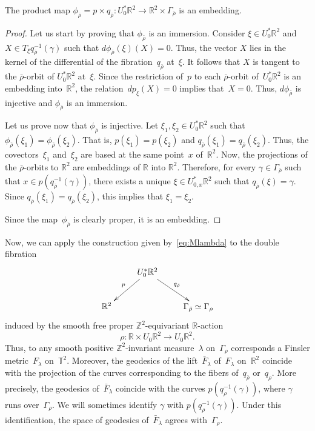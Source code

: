 \documentclass[AHL,Unicode,longabstracts,published]{cedram}
\newcommand{\Z}{\mathbb{Z}}
\newcommand{\R}{\mathbb{R}}
\newcommand{\T}{\mathbb{T}}
\begin{document}
\begin{lemm}
The product map $\phi_{\bar{\rho}}=p \times q_{\bar{\rho}}:U^{*}_{0}\R^{2}\rightarrow\R^{2}\times\Gamma_{\bar{\rho}}$ is an embedding.
\end{lemm}

\begin{proof}
Let us start by proving that $\phi_{\bar{\rho}}$ is an immersion. Consider $\xi\in U_0^{*}\R^{2}$ and $X\in T_{\xi} q_{\bar{\rho}}^{-1}(\gamma)$ such that $d\phi_{\bar{\rho}}(\xi)(X)=0$. Thus, the vector $X$ lies in the kernel of the differential of the fibration~$q_{\bar{\rho}}$ at~$\xi$. It follows that $X$ is tangent to the $\bar{\rho}$-orbit of $U_0^{*}\R^{2}$ at~$\xi$. Since the restriction of~$p$ to each $\bar{\rho}$-orbit of~$U_0^*\R^2$ is an embedding into~$\R^2$, the relation~$dp_\xi(X)=0$ implies that~$X=0$. Thus, $d\phi_{\bar{\rho}}$ is injective and $\phi_{\bar{\rho}}$ is an immersion.

Let us prove now that $\phi_{\bar{\rho}}$ is injective. Let $\xi_{1}, \xi_{2} \in U_0^{*}\R^{2}$ such that $\phi_{\bar{\rho}}(\xi_{1})=\phi_{\bar{\rho}}(\xi_{2})$. That is, $p(\xi_{1})=p(\xi_{2})$ and $q_{\bar{\rho}}(\xi_{1})=q_{\bar{\rho}}(\xi_{2})$. Thus, the covectors~$\xi_{1}$ and~$\xi_{2}$ are based at the same point~$x$ of~$\R^{2}$. Now, the projections of the $\bar{\rho}$-orbits to $\R^{2}$ are embeddings of $\R$ into $\R^{2}$. Therefore, for every $\gamma\in\Gamma_{\bar{\rho}}$ such that $x\in p(q_{\bar{\rho}}^{-1}(\gamma))$, there exists a unique $\xi\in U^{*}_{0,x}\R^{2}$ such that $q_{\bar{\rho}}(\xi)=\gamma$. Since $q_{\bar{\rho}}(\xi_1) = q_{\bar{\rho}}(\xi_2)$, this implies that $\xi_{1}=\xi_{2}$.

Since the map~$\phi_{\bar{\rho}}$ is clearly proper, it is an embedding.
\end{proof}


Now, we can apply the construction given by~\eqref{eq:Mlambda} to the double fibration
\[
\xymatrix{ & U_0^* \R^2 \ar[dl]_p \ar[dr]^{q_{\bar{\rho}}} \\
\R^2 & & \Gamma_{\bar{\rho}} \simeq \Gamma_\rho}
\]
induced by the smooth free proper $\Z^2$-equivariant $\R$-action
\[
\rho:\R \times U_0\R^2 \to U_0\R^2.
\]
Thus, to any smooth positive $\Z^2$-invariant measure~$\lambda$ on~$\Gamma_\rho$ corresponds a Finsler metric~$F_\lambda$ on~$\T^2$. Moreover, the geodesics of the lift~$\bar{F}_\lambda$ of~$F_\lambda$ on~$\R^2$ coincide with the projection of the curves corresponding to the fibers of~$q_{\bar{\rho}}$ or~$q_{\rho}$. More precisely, the geodesics of~$\bar{F}_\lambda$ coincide with the curves $p(q_{\rho}^{-1}(\gamma))$, where $\gamma$ runs over~$\Gamma_{\rho}$. We will sometimes identify $\gamma$ with $p(q_{\rho}^{-1}(\gamma))$. Under this identification, the space of geodesics of~$\bar{F}_\lambda$ agrees with~$\Gamma_\rho$.
\end{document}
